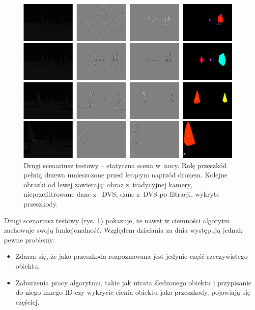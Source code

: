\begin{figure}
    \centering
    \begin{minipage}{1\textwidth}
        \centering
        \includegraphics[width = 1\textwidth]{images/trees_night1.png}
    \end{minipage}
    \begin{minipage}{1\textwidth}
        \centering
        \includegraphics[width = 1\textwidth]{images/trees_night2.png}
    \end{minipage}
    \begin{minipage}{1\textwidth}
        \centering
        \includegraphics[width = 1\textwidth]{images/trees_night4.png}
    \end{minipage}
    \begin{minipage}{1\textwidth}
        \centering
        \includegraphics[width = 1\textwidth]{images/trees_night5.png}
    \end{minipage}
  
    \caption{Drugi scenariusz testowy -- statyczna scena w~nocy. Rolę przeszkód pełnią drzewa umieszczone przed lecącym naprzód dronem. Kolejne obrazki od lewej zawierają: obraz z~tradycyjnej kamery, nieprzefiltrowane dane z~ DVS, dane z~DVS po filtracji, wykryte przeszkody.}
    \label{fig:trees_night}
\end{figure}


Drugi scenariusz testowy (rys. \ref{fig:trees_night}) pokazuje, że nawet w ciemności algorytm zachowuje swoją funkcjonalność. Względem działania za dnia występują jednak pewne problemy:
\begin{itemize}
    \item Zdarza się, że jako przeszkoda rozpoznawana jest jedynie część rzeczywistego obiektu,
    \item Zaburzenia pracy algorytmu, takie jak utrata śledzonego obiektu i przypisanie do niego innego ID czy wykrycie cienia obiektu jako przeszkody, pojawiają się częściej.
\end{itemize}

